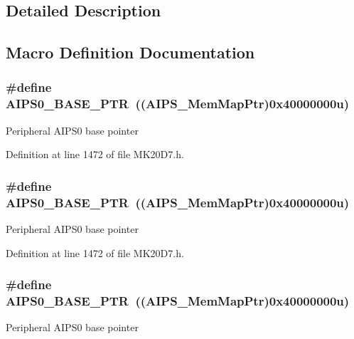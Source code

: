 \subsection{Detailed Description}


\subsection{Macro Definition Documentation}
\subsubsection[{\texorpdfstring{A\+I\+P\+S0\+\_\+\+B\+A\+S\+E\+\_\+\+P\+TR}{AIPS0_BASE_PTR}}]{\setlength{\rightskip}{0pt plus 5cm}\#define A\+I\+P\+S0\+\_\+\+B\+A\+S\+E\+\_\+\+P\+TR~(({\bf A\+I\+P\+S\+\_\+\+Mem\+Map\+Ptr})0x40000000u)}\hypertarget{group___a_i_p_s___peripheral_ga6affb22d1dff0d01c843913f33f1c1a9}{}\label{group___a_i_p_s___peripheral_ga6affb22d1dff0d01c843913f33f1c1a9}
Peripheral A\+I\+P\+S0 base pointer 

Definition at line 1472 of file M\+K20\+D7.\+h.

\subsubsection[{\texorpdfstring{A\+I\+P\+S0\+\_\+\+B\+A\+S\+E\+\_\+\+P\+TR}{AIPS0_BASE_PTR}}]{\setlength{\rightskip}{0pt plus 5cm}\#define A\+I\+P\+S0\+\_\+\+B\+A\+S\+E\+\_\+\+P\+TR~(({\bf A\+I\+P\+S\+\_\+\+Mem\+Map\+Ptr})0x40000000u)}\hypertarget{group___a_i_p_s___peripheral_ga6affb22d1dff0d01c843913f33f1c1a9}{}\label{group___a_i_p_s___peripheral_ga6affb22d1dff0d01c843913f33f1c1a9}
Peripheral A\+I\+P\+S0 base pointer 

Definition at line 1472 of file M\+K20\+D7.\+h.

\subsubsection[{\texorpdfstring{A\+I\+P\+S0\+\_\+\+B\+A\+S\+E\+\_\+\+P\+TR}{AIPS0_BASE_PTR}}]{\setlength{\rightskip}{0pt plus 5cm}\#define A\+I\+P\+S0\+\_\+\+B\+A\+S\+E\+\_\+\+P\+TR~(({\bf A\+I\+P\+S\+\_\+\+Mem\+Map\+Ptr})0x40000000u)}\hypertarget{group___a_i_p_s___peripheral_ga6affb22d1dff0d01c843913f33f1c1a9}{}\label{group___a_i_p_s___peripheral_ga6affb22d1dff0d01c843913f33f1c1a9}
Peripheral A\+I\+P\+S0 base pointer 

